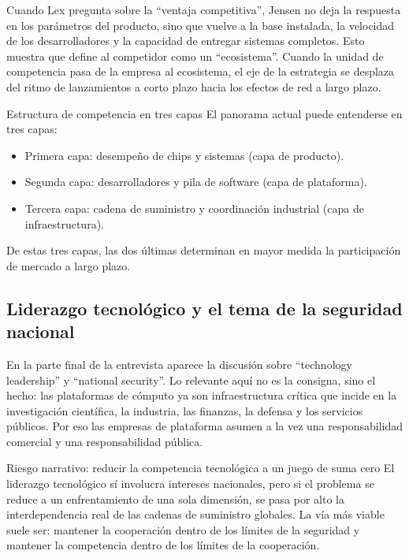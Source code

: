 \documentclass[a4paper]{article}
\begin{document}
Cuando Lex pregunta sobre la ``ventaja competitiva'', Jensen no deja la respuesta en los parámetros del producto, sino que vuelve a la base instalada, la velocidad de los desarrolladores y la capacidad de entregar sistemas completos. Esto muestra que define al competidor como un ``ecosistema''. Cuando la unidad de competencia pasa de la empresa al ecosistema, el eje de la estrategia se desplaza del ritmo de lanzamientos a corto plazo hacia los efectos de red a largo plazo.

\begin{knowledgebox}{Estructura de competencia en tres capas}
El panorama actual puede entenderse en tres capas:
\begin{itemize}
    \item Primera capa: desempeño de chips y sistemas (capa de producto).
    \item Segunda capa: desarrolladores y pila de software (capa de plataforma).
    \item Tercera capa: cadena de suministro y coordinación industrial (capa de infraestructura).
\end{itemize}
De estas tres capas, las dos últimas determinan en mayor medida la participación de mercado a largo plazo.
\end{knowledgebox}

\subsection{Liderazgo tecnológico y el tema de la seguridad nacional}

En la parte final de la entrevista aparece la discusión sobre ``technology leadership'' y ``national security''. Lo relevante aquí no es la consigna, sino el hecho: las plataformas de cómputo ya son infraestructura crítica que incide en la investigación científica, la industria, las finanzas, la defensa y los servicios públicos. Por eso las empresas de plataforma asumen a la vez una responsabilidad comercial y una responsabilidad pública.

\begin{warningbox}{Riesgo narrativo: reducir la competencia tecnológica a un juego de suma cero}
El liderazgo tecnológico sí involucra intereses nacionales, pero si el problema se reduce a un enfrentamiento de una sola dimensión, se pasa por alto la interdependencia real de las cadenas de suministro globales. La vía más viable suele ser: mantener la cooperación dentro de los límites de la seguridad y mantener la competencia dentro de los límites de la cooperación.
\end{warningbox}
\end{document}
